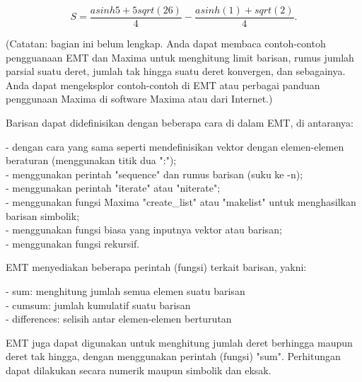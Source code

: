 \documentclass[a4paper,10pt]{article}
\begin{document}
\begin{eulernotebook}
\begin{eulercomment}
\begin{eulercomment}
\begin{eulercomment}
\begin{eulercomment}
\begin{eulercomment}
\begin{eulercomment}
\begin{eulercomment}
\begin{eulercomment}
\begin{eulercomment}
\begin{eulercomment}
\begin{eulerformula}
\[
\text{$S=\frac{asinh 5+5sqrt(26)}{4}-\frac{asinh(1)+sqrt(2)}{4}$}.
\]
\end{eulerformula}
\begin{eulercomment}
\begin{eulercomment}
\begin{eulercomment}
(Catatan: bagian ini belum lengkap. Anda dapat membaca contoh-contoh
pengguanaan EMT dan Maxima untuk menghitung limit barisan, rumus
jumlah parsial suatu deret, jumlah tak hingga suatu deret konvergen,
dan sebagainya. Anda dapat mengeksplor contoh-contoh di EMT atau
perbagai panduan penggunaan Maxima di software Maxima atau dari
Internet.)

Barisan dapat didefinisikan dengan beberapa cara di dalam EMT, di
antaranya:

- dengan cara yang sama seperti mendefinisikan vektor dengan
elemen-elemen beraturan (menggunakan titik dua ":");\\
- menggunakan perintah "sequence" dan rumus barisan (suku ke -n);\\
- menggunakan perintah "iterate" atau "niterate";\\
- menggunakan fungsi Maxima "create\_list" atau "makelist" untuk
menghasilkan barisan simbolik;\\
- menggunakan fungsi biasa yang inputnya vektor atau barisan;\\
- menggunakan fungsi rekursif.

EMT menyediakan beberapa perintah (fungsi) terkait barisan, yakni:

- sum: menghitung jumlah semua elemen suatu barisan\\
- cumsum: jumlah kumulatif suatu barisan\\
- differences: selisih antar elemen-elemen berturutan

EMT juga dapat digunakan untuk menghitung jumlah deret berhingga
maupun deret tak hingga, dengan menggunakan perintah (fungsi) "sum".
Perhitungan dapat dilakukan secara numerik maupun simbolik dan eksak.


\end{eulercomment}
\end{eulercomment}
\end{eulercomment}
\end{eulercomment}
\end{eulercomment}
\end{eulercomment}
\end{eulercomment}
\end{eulercomment}
\end{eulercomment}
\end{eulercomment}
\end{eulercomment}
\end{eulercomment}
\end{eulercomment}
\end{eulernotebook}
\end{document}
